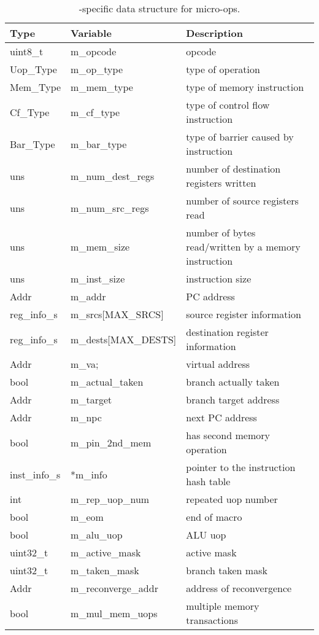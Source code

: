 \begin{table*}[!htb]
\begin{footnotesize}
\begin{center}
\caption{\SIM-specific data structure for micro-ops.}
\label{table:trace_uops}
\begin{tabular}{|l|l|l|} 
\hline
Type      & Variable                 & Description \\ \hline \hline
uint8\_t  & m\_opcode                & opcode \\ \hline
Uop\_Type & m\_op\_type              & type of operation \\ \hline
Mem\_Type & m\_mem\_type             & type of memory instruction \\ \hline
Cf\_Type  & m\_cf\_type              & type of control flow instruction \\ \hline
Bar\_Type & m\_bar\_type             & type of barrier caused by instruction \\ \hline
uns       &   m\_num\_dest\_regs     & number of destination registers written \\ \hline
uns       &   m\_num\_src\_regs      & number of source registers read \\ \hline
uns       &   m\_mem\_size           & number of bytes read/written by a memory instruction \\ \hline
uns       &   m\_inst\_size          & instruction size \\ \hline
Addr      &   m\_addr                & PC address  \\ \hline
reg\_info\_s&   m\_srcs[MAX\_SRCS]   & source register information \\ \hline
reg\_info\_s&   m\_dests[MAX\_DESTS] & destination register information \\ \hline
Addr      &   m\_va;                 & virtual address \\ \hline
bool      &   m\_actual\_taken       & branch actually taken \\ \hline
Addr      &   m\_target              & branch target address \\ \hline
Addr      &   m\_npc                 & next PC address  \\ \hline
bool      &   m\_pin\_2nd\_mem       & has second memory operation \\ \hline
inst\_info\_s& *m\_info              & pointer to the instruction hash table  \\ \hline
int       &   m\_rep\_uop\_num       & repeated uop number \\ \hline
bool      &   m\_eom                 & end of macro \\ \hline
bool      &   m\_alu\_uop            & ALU uop  \\ \hline
uint32\_t  &   m\_active\_mask       & active mask \\ \hline
uint32\_t  &   m\_taken\_mask        & branch taken mask \\ \hline
Addr      &   m\_reconverge\_addr    & address of reconvergence \\ \hline
bool      &   m\_mul\_mem\_uops      & multiple memory transactions \\ \hline


\end{tabular}
\end{center}
\end{footnotesize}
\end{table*}
